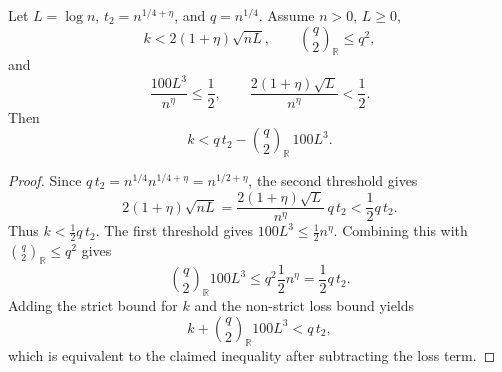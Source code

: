 \begin{helper}
Let \(L=\log n\), \(t_2=n^{1/4+\eta}\), and \(q=n^{1/4}\).  Assume
\(n>0\), \(L\ge0\),
\[
k<2(1+\eta)\sqrt{nL},\qquad
\binom{q}{2}_{\mathbb R}\le q^2,
\]
and
\[
\frac{100L^3}{n^\eta}\le\frac12,\qquad
\frac{2(1+\eta)\sqrt L}{n^\eta}<\frac12.
\]
Then
\[
k<q\,t_2-\binom{q}{2}_{\mathbb R}\,100L^3.
\]
\end{helper}
\begin{proof}
Since \(q\,t_2=n^{1/4}n^{1/4+\eta}=n^{1/2+\eta}\), the second threshold gives
\[
2(1+\eta)\sqrt{nL}
  =\frac{2(1+\eta)\sqrt L}{n^\eta}\,q\,t_2
  <\frac12 q\,t_2.
\]
Thus \(k<\frac12 q\,t_2\).  The first threshold gives
\(100L^3\le\frac12 n^\eta\).  Combining this with
\(\binom{q}{2}_{\mathbb R}\le q^2\) gives
\[
\binom{q}{2}_{\mathbb R}100L^3
  \le q^2\frac12 n^\eta
  =\frac12 q\,t_2.
\]
Adding the strict bound for \(k\) and the non-strict loss bound yields
\[
k+\binom{q}{2}_{\mathbb R}100L^3<q\,t_2,
\]
which is equivalent to the claimed inequality after subtracting the loss
term.
\end{proof}
